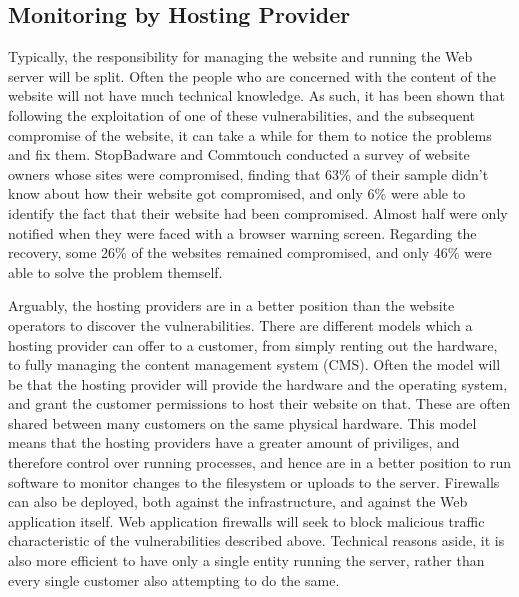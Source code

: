 \documentclass{acm_proc_article-sp}
\begin{document}
\subsection{Monitoring by Hosting Provider}
Typically, the responsibility for managing the website and running the Web server will be split.  Often the people who are concerned with the content of the website will not have much technical knowledge.  As such, it has been shown that following the exploitation of one of these vulnerabilities, and the subsequent compromise of the website, it can take a while for them to notice the problems and fix them.  StopBadware and Commtouch conducted a survey of website owners whose sites were compromised, finding that 63\% of their sample didn't know about how their website got compromised, and only 6\% were able to identify the fact that their website had been compromised.  Almost half were only notified when they were faced with a browser warning screen.  Regarding the recovery, some 26\% of the websites remained compromised, and only 46\% were able to solve the problem themself\cite{stopBadware}.

Arguably, the hosting providers are in a better position than the website operators to discover the vulnerabilities.  There are different models which a hosting provider can offer to a customer, from simply renting out the hardware, to fully managing the content management system (CMS).  Often the model will be that the hosting provider will provide the hardware and the operating system, and grant the customer permissions to host their website on that.  These are often shared between many customers on the same physical hardware.  This model means that the hosting providers have a greater amount of priviliges, and therefore control over running processes, and hence are in a better position to run software to monitor changes to the filesystem or uploads to the server.  Firewalls can also be deployed, both against the infrastructure, and against the Web application itself.  Web application firewalls will seek to block malicious traffic characteristic of the vulnerabilities described above.  Technical reasons aside, it is also more efficient to have only a single entity running the server, rather than every single customer also attempting to do the same.
\end{document}
